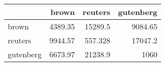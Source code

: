 \begin{tabular}{lrrr}
\hline
           &   brown &   reuters &   gutenberg \\
\hline
 brown     & 4389.35 & 15289.5   &     9084.65 \\
 reuters   & 9944.57 &   557.328 &    17047.2  \\
 gutenberg & 6673.97 & 21238.9   &     1060    \\
\hline
\end{tabular}